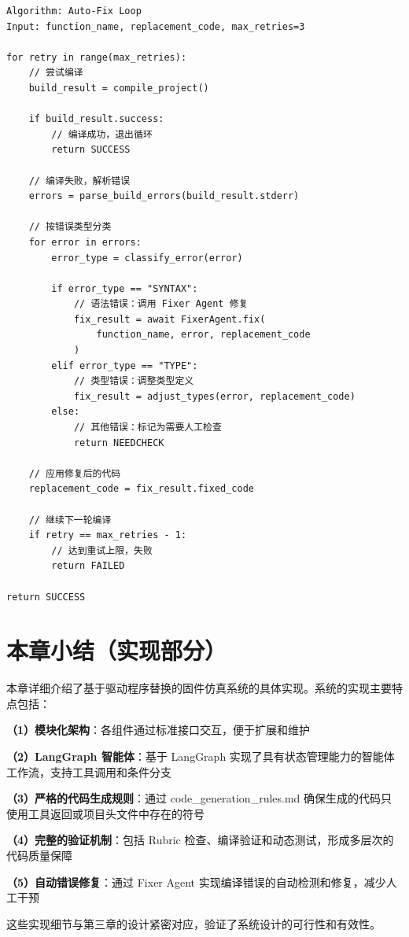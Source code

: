 \begin{lstlisting}[style=Python,abovecaptionskip=0pt,belowcaptionskip=0pt]
Algorithm: Auto-Fix Loop
Input: function_name, replacement_code, max_retries=3

for retry in range(max_retries):
    // 尝试编译
    build_result = compile_project()
    
    if build_result.success:
        // 编译成功，退出循环
        return SUCCESS
    
    // 编译失败，解析错误
    errors = parse_build_errors(build_result.stderr)
    
    // 按错误类型分类
    for error in errors:
        error_type = classify_error(error)
        
        if error_type == "SYNTAX":
            // 语法错误：调用 Fixer Agent 修复
            fix_result = await FixerAgent.fix(
                function_name, error, replacement_code
            )
        elif error_type == "TYPE":
            // 类型错误：调整类型定义
            fix_result = adjust_types(error, replacement_code)
        else:
            // 其他错误：标记为需要人工检查
            return NEEDCHECK
    
    // 应用修复后的代码
    replacement_code = fix_result.fixed_code
    
    // 继续下一轮编译
    if retry == max_retries - 1:
        // 达到重试上限，失败
        return FAILED

return SUCCESS
\end{lstlisting}

\section{本章小结（实现部分）}
\label{sec:implementation_summary_impl}

本章详细介绍了基于驱动程序替换的固件仿真系统的具体实现。系统的实现主要特点包括：

\textbf{（1）模块化架构}：各组件通过标准接口交互，便于扩展和维护

\textbf{（2）LangGraph 智能体}：基于 LangGraph 实现了具有状态管理能力的智能体工作流，支持工具调用和条件分支

\textbf{（3）严格的代码生成规则}：通过 code\_generation\_rules.md 确保生成的代码只使用工具返回或项目头文件中存在的符号

\textbf{（4）完整的验证机制}：包括 Rubric 检查、编译验证和动态测试，形成多层次的代码质量保障

\textbf{（5）自动错误修复}：通过 Fixer Agent 实现编译错误的自动检测和修复，减少人工干预

这些实现细节与第三章的设计紧密对应，验证了系统设计的可行性和有效性。
